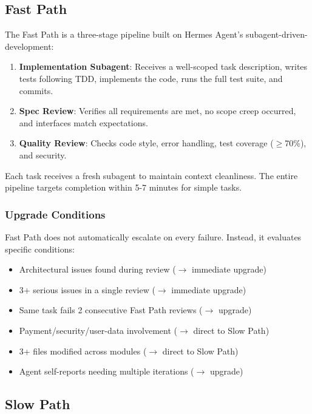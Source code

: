 \documentclass[11pt,a4paper]{article}
\begin{document}
\subsection{Fast Path}

The Fast Path is a three-stage pipeline built on Hermes Agent's subagent-driven-development:

\begin{enumerate}
    \item \textbf{Implementation Subagent}: Receives a well-scoped task description, writes tests following TDD, implements the code, runs the full test suite, and commits.
    \item \textbf{Spec Review}: Verifies all requirements are met, no scope creep occurred, and interfaces match expectations.
    \item \textbf{Quality Review}: Checks code style, error handling, test coverage ($\geq$70\%), and security.
\end{enumerate}

Each task receives a fresh subagent to maintain context cleanliness. The entire pipeline targets completion within 5-7 minutes for simple tasks.

\subsubsection{Upgrade Conditions}

Fast Path does not automatically escalate on every failure. Instead, it evaluates specific conditions:

\begin{itemize}
    \item Architectural issues found during review ($\rightarrow$ immediate upgrade)
    \item 3+ serious issues in a single review ($\rightarrow$ immediate upgrade)
    \item Same task fails 2 consecutive Fast Path reviews ($\rightarrow$ upgrade)
    \item Payment/security/user-data involvement ($\rightarrow$ direct to Slow Path)
    \item 3+ files modified across modules ($\rightarrow$ direct to Slow Path)
    \item Agent self-reports needing multiple iterations ($\rightarrow$ upgrade)
\end{itemize}

\subsection{Slow Path}
\end{document}
